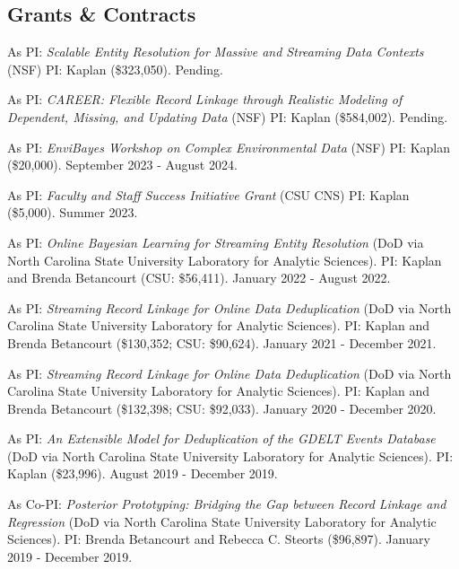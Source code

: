 \documentclass[margin,line]{res}
\begin{document}
\begin{resume}
\section{\sc Grants \& Contracts}

As PI: {\em Scalable Entity Resolution for Massive and Streaming Data Contexts} (NSF) PI: Kaplan (\$323,050). Pending.

As PI: {\em CAREER: Flexible Record Linkage through Realistic Modeling of Dependent, Missing, and Updating Data} (NSF) PI: Kaplan (\$584,002). Pending. 

As PI: {\em EnviBayes Workshop on Complex Environmental Data} (NSF) PI: Kaplan (\$20,000). September 2023 - August 2024.

As PI: {\em Faculty and Staff Success Initiative Grant} (CSU CNS) PI: Kaplan (\$5,000). Summer 2023.

As PI: {\em Online Bayesian Learning for Streaming Entity Resolution} (DoD via North Carolina State University Laboratory for Analytic Sciences). PI: Kaplan and Brenda Betancourt (CSU: \$56,411). January 2022 - August 2022.

As PI: {\em Streaming Record Linkage for Online Data Deduplication} (DoD via North Carolina State University Laboratory for Analytic Sciences). PI: Kaplan and Brenda Betancourt (\$130,352; CSU: \$90,624). January 2021 - December 2021.

As PI: {\em Streaming Record Linkage for Online Data Deduplication} (DoD via North Carolina State University Laboratory for Analytic Sciences). PI: Kaplan and Brenda Betancourt (\$132,398; CSU: \$92,033). January 2020 - December 2020.

As PI: {\em An Extensible Model for Deduplication of the GDELT Events Database} (DoD via North Carolina State University Laboratory for Analytic Sciences). PI: Kaplan (\$23,996). August 2019 - December 2019.

As Co-PI: {\em Posterior Prototyping: Bridging the Gap between Record Linkage and Regression} (DoD via North Carolina State University Laboratory for Analytic Sciences). PI: Brenda Betancourt and Rebecca C. Steorts (\$96,897). January 2019 - December 2019.

 
 

\end{resume}
\end{document}
